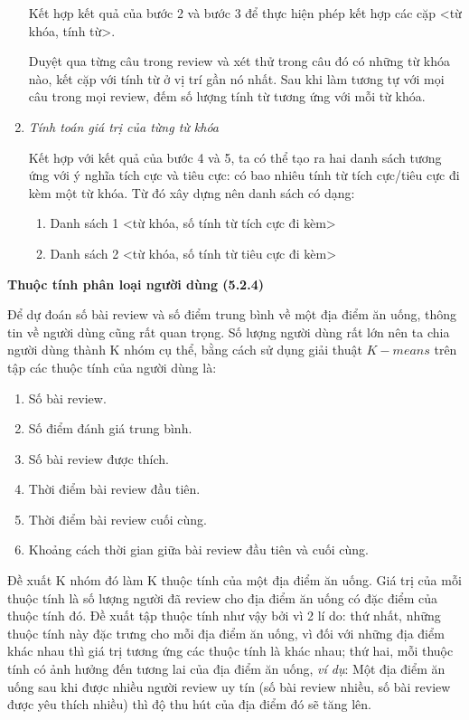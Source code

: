 \documentclass[12pt]{extarticle}
\begin{document}
\begin{enumerate}
						\par Kết hợp kết quả của bước 2 và bước 3 để thực hiện phép kết hợp các cặp <từ khóa, tính từ>. 	
						\par Duyệt qua từng câu trong review và xét thử trong câu đó có những từ khóa nào, kết cặp với tính từ ở vị trí gần nó nhất. Sau khi làm tương tự với mọi câu trong mọi review, đếm số lượng tính từ tương ứng với mỗi từ khóa.
					\item \textit{Tính toán giá trị của từng từ khóa}
						\par Kết hợp với kết quả của bước 4 và 5, ta có thể tạo ra hai danh sách tương ứng với ý nghĩa tích cực và tiêu cực: có bao nhiêu tính từ tích cực/tiêu cực đi kèm một từ khóa. Từ đó xây dựng nên danh sách có dạng:
						\begin{enumerate}
							\item Danh sách 1 <từ khóa, số tính từ tích cực đi kèm>
							\item Danh sách 2 <từ khóa, số tính từ tiêu cực đi kèm>
						\end{enumerate}
				\end{enumerate}
			\par \textbf{Thuộc tính phân loại người dùng (5.2.4)}
				\par Để dự đoán số bài review và số điểm trung bình về một địa điểm ăn uống, thông tin về người dùng cũng rất quan trọng. Số lượng người dùng rất lớn nên ta chia người dùng thành K nhóm cụ thể, bằng cách sử dụng giải thuật $K-means$ trên tập các thuộc tính của người dùng là:
				\begin{enumerate}
					\item Số bài review.
					\item Số điểm đánh giá trung bình.
					\item Số bài review được thích.
					\item Thời điểm bài review đầu tiên.
					\item Thời điểm bài review cuối cùng.
					\item Khoảng cách thời gian giữa bài review đầu tiên và cuối cùng.
				\end{enumerate}
				\par Đề xuất K nhóm đó làm K thuộc tính của một địa điểm ăn uống. Giá trị của mỗi thuộc tính là số lượng người đã review cho địa điểm ăn uống có đặc điểm của thuộc tính đó. Đề xuất tập thuộc tính như vậy bởi vì 2 lí do: thứ nhất, những thuộc tính này đặc trưng cho mỗi địa điểm ăn uống, vì đối với những địa điểm khác nhau thì giá trị tương ứng các thuộc tính là khác nhau; thứ hai, mỗi thuộc tính có ảnh hưởng đến tương lai của địa điểm ăn uống, \textit{ví dụ}: Một địa điểm ăn uống sau khi được nhiều người review uy tín (số bài review nhiều, số bài review được yêu thích nhiều) thì độ thu hút của địa điểm đó sẽ tăng lên.  
\end{document}
